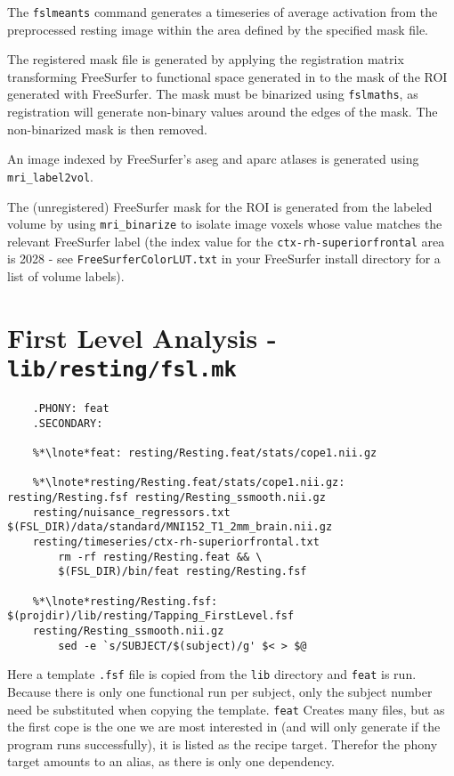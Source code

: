 The \texttt{fslmeants} command generates a timeseries of average activation from the preprocessed resting image within the area defined by the specified mask file.

The registered mask file is generated by applying the registration matrix transforming FreeSurfer to functional space generated in  to the mask of the ROI generated with FreeSurfer. The mask must be binarized using \texttt{fslmaths}, as registration will generate non-binary values around the edges of the mask. The non-binarized mask is then removed.

An image indexed by FreeSurfer's aseg and aparc atlases is generated using \texttt{mri_label2vol}.

The (unregistered) FreeSurfer mask for the ROI is generated from the labeled volume by using \texttt{mri_binarize} to isolate image voxels whose value matches the relevant FreeSurfer label (the index value for the \texttt{ctx-rh-superiorfrontal} area is 2028 - see \texttt{FreeSurferColorLUT.txt} in your FreeSurfer install directory for a list of volume labels).

\section{First Level Analysis - \texttt{lib/resting/fsl.mk}}
\begin{lstlisting}
	.PHONY: feat
	.SECONDARY:
	
	%*\lnote*feat: resting/Resting.feat/stats/cope1.nii.gz
	
	%*\lnote*resting/Resting.feat/stats/cope1.nii.gz: resting/Resting.fsf resting/Resting_ssmooth.nii.gz 
	resting/nuisance_regressors.txt $(FSL_DIR)/data/standard/MNI152_T1_2mm_brain.nii.gz 
	resting/timeseries/ctx-rh-superiorfrontal.txt
		rm -rf resting/Resting.feat && \
		$(FSL_DIR)/bin/feat resting/Resting.fsf
	
	%*\lnote*resting/Resting.fsf: $(projdir)/lib/resting/Tapping_FirstLevel.fsf 
	resting/Resting_ssmooth.nii.gz
		sed -e `s/SUBJECT/$(subject)/g' $< > $@
\end{lstlisting}
Here a template \texttt{.fsf} file is copied from the \texttt{lib} directory and \texttt{feat} is run. Because there is only one functional run per subject, only the subject number need be substituted when copying the template.
\lnum{41}\texttt{feat} Creates many files, but as the first cope is the one we are most interested in (and will only generate if the program runs successfully), it is listed as the recipe target. Therefor the phony target amounts to an alias, as there is only one dependency.

